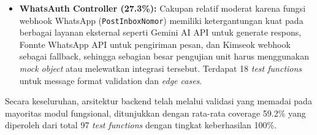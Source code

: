 \begin{itemize}[leftmargin=*]
    \item \textbf{WhatsAuth Controller (27.3\%):} Cakupan relatif moderat karena fungsi webhook WhatsApp (\texttt{PostInboxNomor}) memiliki ketergantungan kuat pada berbagai layanan eksternal seperti Gemini AI API untuk generate respons, Fonnte WhatsApp API untuk pengiriman pesan, dan Kimseok webhook sebagai fallback, sehingga sebagian besar pengujian unit harus menggunakan \textit{mock object} atau melewatkan integrasi tersebut. Terdapat 18 \textit{test functions} untuk message format validation dan \textit{edge cases}.
\end{itemize}

Secara keseluruhan, arsitektur backend telah melalui validasi yang memadai pada mayoritas modul fungsional, ditunjukkan dengan rata-rata coverage 59.2\% yang diperoleh dari total 97 \textit{test functions} dengan tingkat keberhasilan 100\%.
